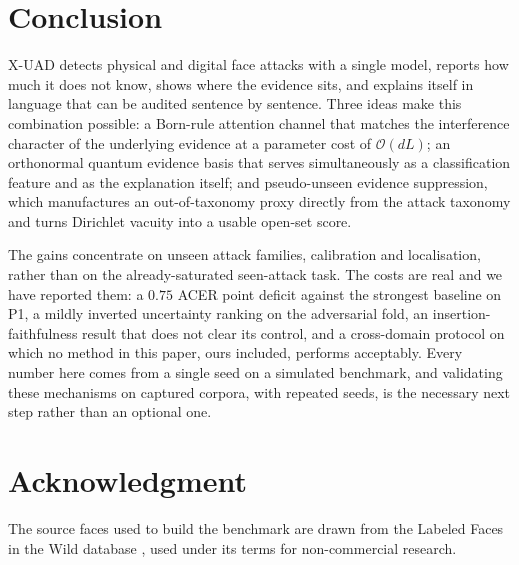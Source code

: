 \documentclass[conference]{IEEEtran}
\begin{document}
\section{Conclusion}
X-UAD detects physical and digital face attacks with a single model, reports how much
it does not know, shows where the evidence sits, and explains itself in language that
can be audited sentence by sentence. Three ideas make this combination possible: a
Born-rule attention channel that matches the interference character of the underlying
evidence at a parameter cost of $\mathcal{O}(dL)$; an orthonormal quantum evidence
basis that serves simultaneously as a classification feature and as the explanation
itself; and pseudo-unseen evidence suppression, which manufactures an out-of-taxonomy
proxy directly from the attack taxonomy and turns Dirichlet vacuity into a usable
open-set score.

The gains concentrate on unseen attack families, calibration and localisation, rather
than on the already-saturated seen-attack task. The costs are real and we have
reported them: a $0.75$ ACER point deficit against the strongest baseline on P1, a
mildly inverted uncertainty ranking on the adversarial fold, an insertion-faithfulness
result that does not clear its control, and a cross-domain protocol on which no
method in this paper, ours included, performs acceptably. Every number here comes from
a single seed on a simulated benchmark, and validating these mechanisms on captured
corpora, with repeated seeds, is the necessary next step rather than an optional one.

\section*{Acknowledgment}
The source faces used to build the benchmark are drawn from the Labeled Faces in the
Wild database \cite{huang2007lfw}, used under its terms for non-commercial research.



\end{document}
